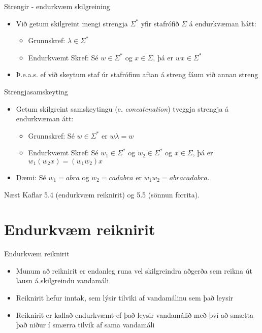 \documentclass[handout]{beamer}
\begin{document}
\begin{frame}{Strengir - endurkvæm skilgreining}
\begin{itemize}
 \item Við getum skilgreint mengi strengja $\Sigma^*$ yfir stafrófið $\Sigma$ á endurkvæman hátt:
 \begin{itemize}
  \item Grunnskref: $\lambda \in \Sigma^*$
  \item Endurkvæmt Skref: Sé $w \in \Sigma^*$ og $x \in \Sigma$, þá er $wx \in \Sigma^*$
 \end{itemize}
 \item Þ.e.a.s. ef við skeytum staf úr stafrófinu aftan á streng fáum við annan streng
\end{itemize}
\end{frame}

\begin{frame}{Strengjasamskeyting}
\begin{itemize}
 \item Getum skilgreint samskeytingu (e. \emph{concatenation}) tveggja strengja á endurkvæman átt:
 \begin{itemize}
  \item Grunnskref: Sé $w \in \Sigma^*$ er $w\lambda = w$
  \item Endurkvæmt Skref: Sé $w_1 \in \Sigma^*$ og $w_2 \in \Sigma^*$ og $x \in \Sigma$, þá er $w_1(w_2x) = (w_1w_2)x$
 \end{itemize}
 \item Dæmi: Sé $w_1 = abra$ og $w_2 = cadabra$ er $w_1w_2 = abracadabra$.
\end{itemize}
\end{frame}

\begin{frame}{Næst}
Kaflar 5.4 (endurkvæm reiknirit) og 5.5 (sönnun forrita).
\end{frame}


\section{Endurkvæm reiknirit}

\begin{frame}{Endurkvæm reiknirit}
\begin{itemize}
 \item Munum að reiknirit er endanleg runa vel skilgreindra aðgerða sem reikna út lausn á skilgreindu vandamáli
 \item Reiknirit hefur inntak, sem lýsir tilviki af vandamálinu sem það leysir
 \item Reiknirit er kallað endurkvæmt ef það leysir vandamálið með því að smætta það niður í smærra tilvik af sama vandamáli
\end{itemize}
\end{frame}
\end{document}
